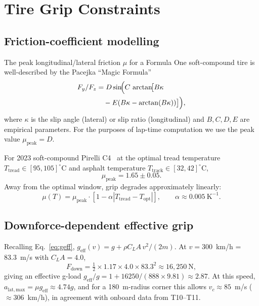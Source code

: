 \documentclass[11pt,twocolumn]{article}
\theoremstyle{definition}
\theoremstyle{remark}
\begin{document}
\section{Tire Grip Constraints}
\label{sec:tire}

\subsection{Friction-coefficient modelling}

The peak longitudinal/lateral friction $\mu$ for a Formula One soft-compound
tire is well-described by the Pacejka ``Magic Formula''~\cite{pacejka1987,pacejka2012}
\begin{align}
  F_y/F_z &= D \sin\!\Bigl( C\,\arctan\!\bigl[ B\kappa \notag\\
  &\quad - E( B\kappa - \arctan(B\kappa) ) \bigr]\Bigr),
  \label{eq:pacejka}
\end{align}
where $\kappa$ is the slip angle (lateral) or slip ratio (longitudinal) and
$B,C,D,E$ are empirical parameters. For the purposes of lap-time computation
we use the peak value $\mu_{\mathrm{peak}} = D$.

For 2023 soft-compound Pirelli C4~\cite{pirelli2023} at the optimal tread
temperature
$T_{\mathrm{tread}} \in [95, 105]^\circ$C and asphalt temperature
$T_{\mathrm{track}} \in [32, 42]^\circ$C,
\[
  \mu_{\mathrm{peak}} = 1.65 \pm 0.05.
\]
Away from the optimal window, grip degrades approximately linearly:
\begin{equation}
  \mu(T) = \mu_{\mathrm{peak}}\cdot
  \left[1 - \alpha|T_{\mathrm{tread}} - T_{\mathrm{opt}}|\right],
  \qquad \alpha \approx 0.005~\mathrm{K}^{-1}.
\end{equation}

\subsection{Downforce-dependent effective grip}

Recalling Eq.~\eqref{eq:geff},
$g_{\mathrm{eff}}(v) = g + \rho C_L A\, v^2/(2m)$. At $v = 300$~km/h =
83.3~m/s with $C_L A = 4.0$,
\[
  F_{\mathrm{down}} = \tfrac{1}{2} \times 1.17 \times 4.0 \times 83.3^2
  \approx 16{,}250~\mathrm{N},
\]
giving an effective g-load
$g_{\mathrm{eff}}/g = 1 + 16250/(888 \times 9.81) \approx 2.87$.
At this speed, $a_{\mathrm{lat,max}} = \mu g_{\mathrm{eff}} \approx 4.74g$,
and for a 180~m-radius corner this allows $v_c \approx 85$~m/s
($\approx 306$~km/h), in agreement with onboard data from T10--T11.
\end{document}
